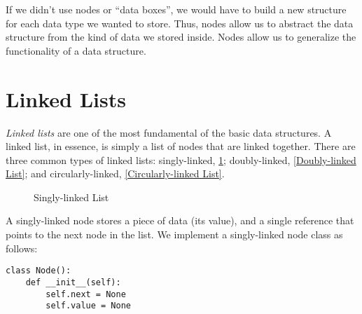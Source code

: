 If we didn't use nodes or ``data boxes'', we would have to build a new structure for each data type we wanted to store.
Thus, nodes allow us to abstract the data structure from the kind of data we stored inside.
Nodes allow us to generalize the functionality of a data structure.

\section*{Linked Lists}
\emph{Linked lists} are one of the most fundamental of the basic data structures.
A linked list, in essence, is simply a list of nodes that are linked together.
There are three common types of linked lists: singly-linked, \ref{Singly-linked List}; doubly-linked, \ref{Doubly-linked List}; and circularly-linked, \ref{Circularly-linked List}.

\begin{figure}[!h]
\centering
{}
\caption{Singly-linked List}
\label{Singly-linked List}
\end{figure}

A singly-linked node stores a piece of data (its value), and a single reference that points to the next node in the list.
We implement a singly-linked node class as follows:

\begin{lstlisting}
class Node():
    def __init__(self):
        self.next = None
        self.value = None
\end{lstlisting}

